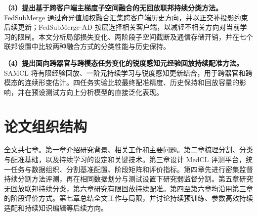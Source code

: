 \textbf{（3）提出基于跨客户端主梯度子空间融合的无回放联邦持续分类方法。}
FedSubMerge 通过奇异值加权融合汇集跨客户端历史方向，并以正交补投影约束后续更新；FedSubMerge-AD 按层选择相关客户端，以减轻不相关方向对当前学习的限制。本文分析局部损失变化、两阶段子空间截断及通信存储开销，并在七个联邦设置中比较两种融合方式的分类性能与历史保持。

\textbf{（4）提出面向跨器官与跨模态任务变化的锐度感知元经验回放持续配准方法。}
SAMCL 将有限经验回放、一阶元持续学习与锐度感知更新结合，用于跨器官和跨模态的连续形变估计。四任务实验比较最终配准精度、历史保持和回放容量的影响，并在预设测试方向上分析模型的直接泛化表现。

\section{论文组织结构}
\label{sec:intro-organization}

全文共七章。第一章介绍研究背景、相关工作和主要问题。第二章梳理分割、分类与配准基础，以及持续学习的设定和关键技术。第三章设计 MedCL 评测平台，统一任务与数据组织、分割基准配置、阶段矩阵和评价指标。第四章先进行密集监督持续分割方法评测，再在相同数据划分与测试设置下研究弱监督分割。第五章研究无回放联邦持续分类，第六章研究有限回放持续配准。第四至第六章均沿用第三章的阶段评价方式。第七章总结全文工作与局限，并讨论持续预训练、参数高效持续适配和持续知识编辑等后续方向。
